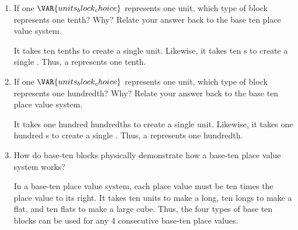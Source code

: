 \begin{enumerate}
    \item If one $\VAR{units_block_choice}$ represents one unit, which type of block represents one tenth? Why? Relate your answer back to the base ten place value system.

    \vspace{20pt}
    \begin{ansenv}
        It takes ten tenths to create a single unit. Likewise, it takes ten s to create a single . Thus, a  represents one tenth.
    \end{ansenv}
    \vfill

    \item If one $\VAR{units_block_choice}$ represents one unit, which type of block represents one hundredth? Why? Relate your answer back to the base ten place value system.

    \vspace{20pt}
    \begin{ansenv}
        It takes one hundred hundredths to create a single unit. Likewise, it takes one hundred s to create a single . Thus, a  represents one hundredth. 
    \end{ansenv}
    \vfill

    \item How do base-ten blocks physically demonstrate how a base-ten place value system works?

    \vspace{20pt}
    \begin{ansenv}
        In a base-ten place value system, each place value must be ten times the place value to its right. It takes ten units to make a long, ten longs to make a flat, and ten flats to make a large cube. Thus, the four types of base ten blocks can be used for any 4 consecutive base-ten place values.
    \end{ansenv}
    \vfill

\end{enumerate}
